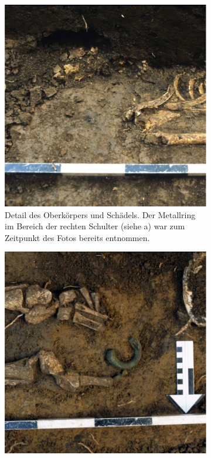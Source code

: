 \begin{figure}[p]
\begin{subfigure}[t]{\textwidth}
		\label{fig:BLK87-1_Übersicht}
	\end{subfigure}
	\begin{subfigure}[t]{\columnwidth} 
		\centering
		\includegraphics[width = \textwidth]{fig/BLK87-1_F87-01-27.pdf}
		\caption{Detail des Oberkörpers und Schädels. Der Metallring im Bereich der rechten Schulter (siehe a) war zum Zeitpunkt des Fotos bereits entnommen.}
		\label{fig:BLK87-1_Kopfbereich}
	\end{subfigure}\hfill
	\begin{subfigure}[t]{\columnwidth} 
		\centering
		\includegraphics[width = \textwidth]{fig/BLK87-1_F87-02-2.pdf}

\end{subfigure}
\end{figure}
